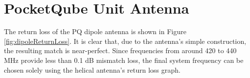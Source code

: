 \graphicspath{{./figures}}

\section{PocketQube Unit Antenna}

The return loss of the PQ dipole antenna is shown in Figure \ref{fig:dipoleReturnLoss}. It is clear that, due to the antenna's simple construction, the resulting match is near-perfect. Since frequencies from around 420 to 440 MHz provide less than 0.1 dB mismatch loss, the final system frequency can be chosen solely using the helical antenna's return loss graph.